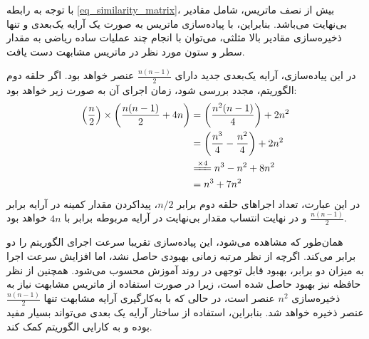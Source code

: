 با توجه به رابطه
\ref{eq_similarity_matrix}،
بیش از نصف ماتریس، شامل مقادیر بی‌نهایت می‌باشد. بنابراین، با پیاده‌سازی ماتریس به صورت یک آرایه یک‌بعدی و تنها ذخیره‌سازی مقادیر بالا مثلثی، می‌توان با انجام چند عملیات ساده ریاضی به مقدار سطر و ستون مورد نظر در ماتریس مشابهت دست یافت.

در این پیاده‌سازی، آرایه یک‌بعدی جدید دارای \(\frac{n(n-1)}{2}\) عنصر خواهد بود. اگر حلقه دوم الگوریتم، مجدد بررسی شود، زمان اجرای آن به صورت زیر خواهد بود:
\begin{equation}
	\begin{align*} 
		\left(\frac{n}{2}\right) \times \left(\frac{n(n-1)}{2} + 4n\right) &= \left(\frac{n^2(n-1)}{4} \right)+2n^2 \\
		&= \left(\frac{n^3}{4} - \frac{n^2}{4}\right) +2n^2 \\
		&\xlongequal{\times 4} n^3-n^2+8n^2 \\
		&= n^3+7n^2
	\end{align*}
\end{equation}
در این عبارت، تعداد اجراهای حلقه دوم برابر \(n/2\)، پیداکردن مقدار کمینه در آرایه برابر \(\frac{n(n-1)}{2}\) و در نهایت انتساب مقدار بی‌نهایت در آرایه مربوطه برابر با \(4n\) خواهد بود.

همان‌طور که مشاهده می‌شود، این پیاده‌سازی تقریبا سرعت اجرای الگوریتم را دو برابر می‌کند. اگرچه از نظر مرتبه زمانی بهبودی حاصل نشد، اما افزایش سرعت اجرا به میزان دو برابر، بهبود قابل توجهی در روند آموزش محسوب می‌شود. همچنین از نظر حافظه نیز بهبود حاصل شده است، زیرا در صورت استفاده از ماتریس مشابهت نیاز به ذخیره‌سازی \(n^2\) عنصر است، در حالی که با به‌کارگیری آرایه مشابهت تنها \(\frac{n(n-1)}{2}\) عنصر ذخیره خواهد شد. بنابراین، استفاده از ساختار آرایه یک بعدی می‌تواند بسیار مفید بوده و به کارایی الگوریتم کمک کند.








